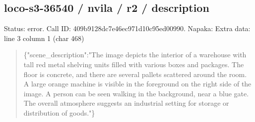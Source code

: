 \documentclass[10pt,a4paper]{article}
\begin{document}
\subsection*{loco-s3-36540 / nvila / r2 / description}
Status: error. Call ID: 409b9128dc7e46ec971d10c95ed00990. Napaka: Extra data: line 3 column 1 (char 468)
\begin{quote}\footnotesize
\{"scene\_description":\allowbreak{}"The image depicts the interior of a warehouse with tall red metal shelving units filled with various boxes and packages. The floor is concrete,\allowbreak{} and there are several pallets scattered around the room. A large orange machine is visible in the foreground on the right side of the image. A person can be seen walking in the background,\allowbreak{} near a blue gate. The overall atmosphere suggests an industrial setting for storage or distribution of goods."\}\par
\par

\end{quote}
\end{document}
